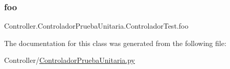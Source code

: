 \subsubsection{\texorpdfstring{foo}{foo}}
{\footnotesize\ttfamily Controller.\+Controlador\+Prueba\+Unitaria.\+Controlador\+Test.\+foo}



The documentation for this class was generated from the following file\+:\begin{DoxyCompactItemize}
\item 
Controller/\hyperlink{_controlador_prueba_unitaria_8py}{Controlador\+Prueba\+Unitaria.\+py}\end{DoxyCompactItemize}
